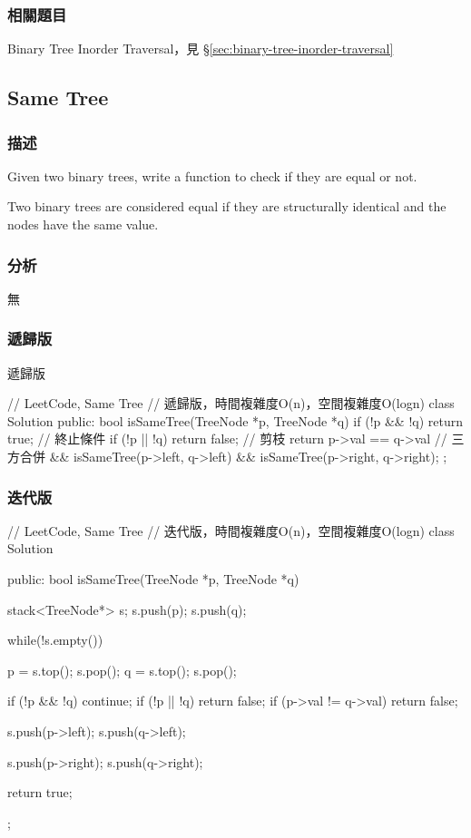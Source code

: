 \subsubsection{相關題目}
\begindot
\item Binary Tree Inorder Traversal，見 \S \ref{sec:binary-tree-inorder-traversal}
\myenddot


\subsection{Same Tree}
\label{sec:same-tree}


\subsubsection{描述}
Given two binary trees, write a function to check if they are equal or not.

Two binary trees are considered equal if they are structurally identical and the nodes have the same value.


\subsubsection{分析}
無


\subsubsection{遞歸版}
遞歸版
\begin{Code}
// LeetCode, Same Tree
// 遞歸版，時間複雜度O(n)，空間複雜度O(logn)
class Solution {
public:
    bool isSameTree(TreeNode *p, TreeNode *q) {
        if (!p && !q) return true;   // 終止條件
        if (!p || !q) return false;  // 剪枝
        return p->val == q->val      // 三方合併
                && isSameTree(p->left, q->left)
                && isSameTree(p->right, q->right);
    }
};
\end{Code}


\subsubsection{迭代版}
\begin{Code}
// LeetCode, Same Tree
// 迭代版，時間複雜度O(n)，空間複雜度O(logn)
class Solution {
public:
    bool isSameTree(TreeNode *p, TreeNode *q) {
        stack<TreeNode*> s;
        s.push(p);
        s.push(q);

        while(!s.empty()) {
            p = s.top(); s.pop();
            q = s.top(); s.pop();

            if (!p && !q) continue;
            if (!p || !q) return false;
            if (p->val != q->val) return false;

            s.push(p->left);
            s.push(q->left);

            s.push(p->right);
            s.push(q->right);
        }
        return true;
    }
};
\end{Code}



